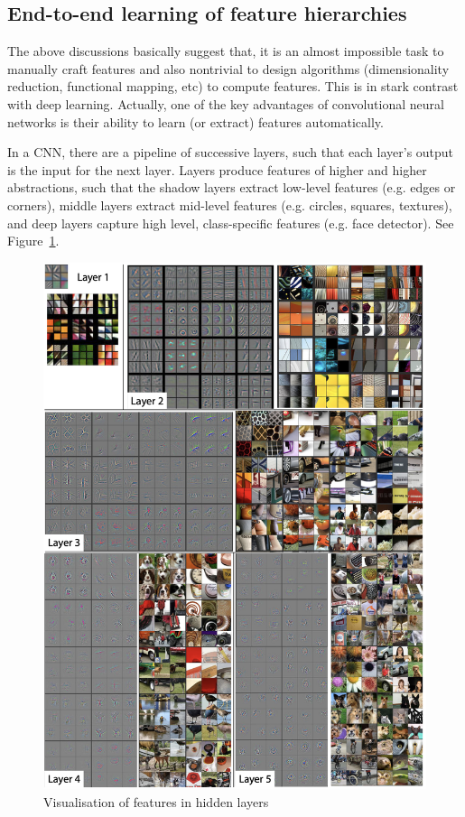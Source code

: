 \subsection*{End-to-end learning of feature hierarchies}

The above discussions basically suggest that, it is an almost impossible task to manually craft features and also nontrivial to design algorithms (dimensionality reduction, functional mapping, etc) to compute features. This is in stark contrast with deep learning. Actually, one of the key advantages of convolutional neural networks is their ability to learn (or extract) features automatically.  

In a CNN, there are a pipeline of successive layers, such that each layer’s output is the input for the next layer. 
Layers produce features of higher and higher abstractions, such that the shadow layers extract low-level features (e.g. edges or corners), middle layers extract mid-level features (e.g. circles, squares, textures), and deep layers capture high level, class-specific features (e.g. face detector). See Figure~\ref{fig:featureVisualisation}. 

\begin{figure}[!htbp]
    \centering
    \includegraphics[width=\textwidth]{images/deepLearning/functionalView/featureVisualisation.png}
    \caption{Visualisation of features in hidden layers  \cite{DBLP:journals/corr/ZeilerF13}}
    \label{fig:featureVisualisation}
\end{figure}

